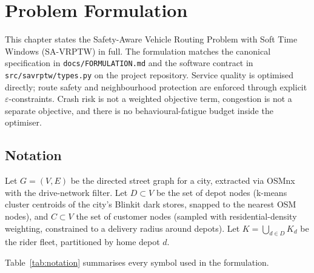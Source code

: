 \chapter{Problem Formulation}
\label{ch3}

This chapter states the Safety-Aware Vehicle Routing Problem with
Soft Time Windows (SA-VRPTW) in full. The formulation matches the
canonical specification in \texttt{docs/FORMULATION.md} and the
software contract in \texttt{src/savrptw/types.py} on the project
repository. Service quality is optimised directly; route safety and
neighbourhood protection are enforced through explicit
$\varepsilon$-constraints. Crash risk is not a weighted objective
term, congestion is not a separate objective, and there is no
behavioural-fatigue budget inside the optimiser.

\section{Notation}

Let $G = (V, E)$ be the directed street graph for a city, extracted
via OSMnx \citep{boeing2017osmnx} with the drive-network filter. Let
$D \subset V$ be the set of depot nodes (k-means cluster centroids of
the city's Blinkit dark stores, snapped to the nearest OSM nodes),
and $C \subset V$ the set of customer nodes (sampled with
residential-density weighting, constrained to a delivery radius
around depots). Let $K = \bigcup_{d \in D} K_d$ be the rider fleet,
partitioned by home depot $d$.

Table~\ref{tab:notation} summarises every symbol used in the
formulation.

